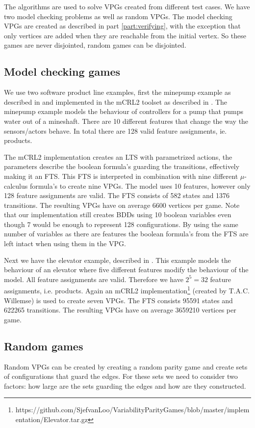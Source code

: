 The algorithms are used to solve VPGs created from different test cases. We have two model checking problems as well as random VPGs. The model checking VPGs are created as described in part \ref{part:verifying}, with the exception that only vertices are added when they are reachable from the initial vertex. So these games are never disjointed, random games can be disjointed.

\subsection{Model checking games}
We use two software product line examples, first the minepump example as described in \cite{Kramer1983CONICAI} and implemented in the mCRL2 toolset as described in \cite{FamBasedModelCheckingWithMCRL2}. The minepump example models the behaviour of controllers for a pump that pumps water out of a mineshaft. There are 10 different features that change the way the sensors/actors behave. In total there are 128 valid feature assignments, ie. products. 

The mCRL2 implementation creates an LTS with parametrized actions, the parameters describe the boolean formula's guarding the transitions, effectively making it an FTS. This FTS is interpreted in combination with nine different $\mu$-calculus formula's to create nine VPGs. The model uses 10 features, however only 128 feature assignments are valid. The FTS consists of 582 states and 1376 transitions. The resulting VPGs have on average 6600 vertices per game. Note that our implementation still creates BDDs using 10 boolean variables even though 7 would be enough to represent 128 configurations. By using the same number of variables as there are features the boolean formula's from the FTS are left intact when using them in the VPG.

Next we have the elevator example, described in \cite{PLATH200153}. This example models the behaviour of an elevator where five different features modify the behaviour of the model. All feature assignments are valid. Therefore we have $2^5 = 32$ feature assignments, i.e. products. Again an mCRL2 implementation\footnote{\label{note1}https://github.com/SjefvanLoo/VariabilityParityGames/blob/master/implementation/Elevator.tar.gz} (created by T.A.C. Willemse) is used to create seven VPGs. The FTS consists 95591 states and 622265 transitions. The resulting VPGs have on average 3659210 vertices per game. 
\subsection{Random games}
Random VPGs can be created by creating a random parity game and create sets of configurations that guard the edges. For these sets we need to consider two factors: how large are the sets guarding the edges and how are they constructed.

